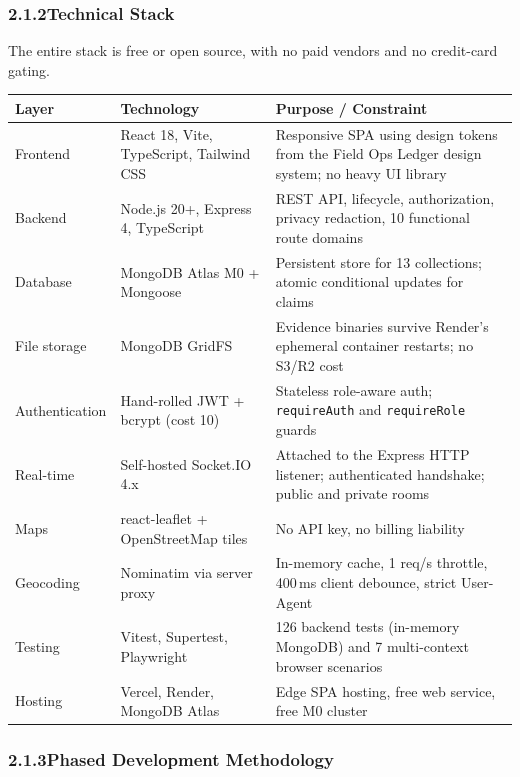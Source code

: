 \documentclass[11pt,a4paper]{article}
\newcommand{\tc}[1]{\texttt{\small #1}}
\begin{document}
\subsubsection{2.1.2\quad Technical Stack}\label{s212}

The entire stack is free or open source, with no paid vendors and no credit-card gating.

\renewcommand{\arraystretch}{1.25}
\begin{tabularx}{\textwidth}{@{}p{1.15in}p{1.95in}X@{}}
\toprule
\textbf{Layer} & \textbf{Technology} & \textbf{Purpose / Constraint}\\
\midrule
Frontend & React 18, Vite, TypeScript, Tailwind CSS & Responsive SPA using design tokens from the Field Ops Ledger design system; no heavy UI library\\
Backend & Node.js 20+, Express 4, TypeScript & REST API, lifecycle, authorization, privacy redaction, 10 functional route domains\\
Database & MongoDB Atlas M0 + Mongoose & Persistent store for 13 collections; atomic conditional updates for claims\\
File storage & MongoDB GridFS & Evidence binaries survive Render's ephemeral container restarts; no S3/R2 cost\\
Authentication & Hand-rolled JWT + bcrypt (cost 10) & Stateless role-aware auth; \tc{requireAuth} and \tc{requireRole} guards\\
Real-time & Self-hosted Socket.IO 4.x & Attached to the Express HTTP listener; authenticated handshake; public and private rooms\\
Maps & react-leaflet + OpenStreetMap tiles & No API key, no billing liability\\
Geocoding & Nominatim via server proxy & In-memory cache, 1 req/s throttle, 400\,ms client debounce, strict User-Agent\\
Testing & Vitest, Supertest, Playwright & 126 backend tests (in-memory MongoDB) and 7 multi-context browser scenarios\\
Hosting & Vercel, Render, MongoDB Atlas & Edge SPA hosting, free web service, free M0 cluster\\
\bottomrule
\end{tabularx}
\renewcommand{\arraystretch}{1}

\subsubsection{2.1.3\quad Phased Development Methodology}\label{s213}
\end{document}
